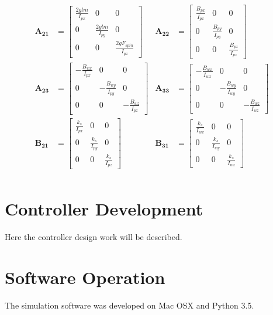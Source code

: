 \documentclass{article}
\begin{document}
\begin{align*}
\boldsymbol{A_{21}} &=
\begin{bmatrix}
\frac{2glm}{I_{px}} & 0 & 0 \\[1em]
0 & \frac{2glm}{I_{py}} & 0 \\[1em]
0 & 0 & \frac{2gF_{spin}}{I_{pz}}
\end{bmatrix}
&
\boldsymbol{A_{22}} &=
\begin{bmatrix}
\frac{B_{px}}{I_{px}} & 0 & 0 \\[1em]
0 & \frac{B_{py}}{I_{py}} & 0 \\[1em]
0 & 0 & \frac{B_{pz}}{I_{pz}}
\end{bmatrix}\\[2em]
\boldsymbol{A_{23}} &=
\begin{bmatrix}
-\frac{B_{wx}}{I_{px}} & 0 & 0 \\[1em]
0 & -\frac{B_{wy}}{I_{py}} & 0 \\[1em]
0 & 0 & -\frac{B_{wz}}{I_{pz}}
\end{bmatrix}
&
\boldsymbol{A_{33}} &=
\begin{bmatrix}
-\frac{B_{wx}}{I_{wx}} & 0 & 0 \\[1em]
0 & -\frac{B_{wy}}{I_{wy}} & 0 \\[1em]
0 & 0 & -\frac{B_{wz}}{I_{wz}}
\end{bmatrix}\\[2em]
\boldsymbol{B_{21}} &=
\begin{bmatrix}
\frac{k_s}{I_{px}} & 0 & 0 \\[1em]
0 & \frac{k_s}{I_{py}} & 0 \\[1em]
0 & 0 & \frac{k_s}{I_{pz}}
\end{bmatrix}
&
\boldsymbol{B_{31}} &=
\begin{bmatrix}
\frac{k_s}{I_{wx}} & 0 & 0 \\[1em]
0 & \frac{k_s}{I_{wy}} & 0 \\[1em]
0 & 0 & \frac{k_s}{I_{wz}}
\end{bmatrix}\\
\end{align*}

\section*{Controller Development}
Here the controller design work will be described.

\section*{Software Operation}
The simulation software was developed on Mac OSX and Python 3.5.
\end{document}
